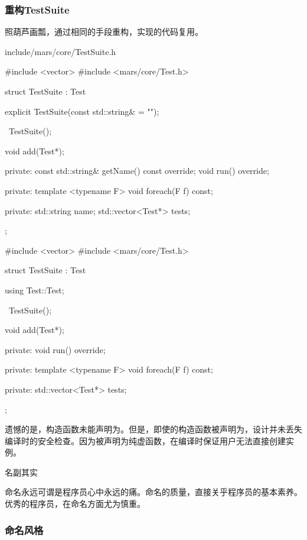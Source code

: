 \begin{content}
\subsubsection{重构TestSuite}

照葫芦画瓢，通过相同的手段重构，实现的代码复用。

\begin{diff}{include/mars/core/TestSuite.h}
 \begin{minicpp}
#include <vector>
#include <mars/core/Test.h>

struct TestSuite : Test {
  explicit TestSuite(const std::string& = "");

  ~TestSuite();

  void add(Test*);

private:
  const std::string& getName() const override;
  void run() override;

private:
  template <typename F>
  void foreach(F f) const;

private:
  std::string name;
  std::vector<Test*> tests;
};
 \end{minicpp}
\tcblower
 \begin{minicpp}
#include <vector>
#include <mars/core/Test.h>

struct TestSuite : Test {
  using Test::Test;

  ~TestSuite();

  void add(Test*);

private:
  void run() override;

private:
  template <typename F>
  void foreach(F f) const;

private:
  std::vector<Test*> tests;
};
 \end{minicpp}
\end{diff}

遗憾的是，构造函数未能声明为。但是，即使的构造函数被声明为，设计并未丢失编译时的安全检查。因为被声明为纯虚函数，在编译时保证用户无法直接创建实例。

\begin{episode}{名副其实}
\begin{content}

命名永远可谓是程序员心中永远的痛。命名的质量，直接关乎程序员的基本素养。优秀的程序员，在命名方面尤为慎重。

\subsubsection{命名风格}


\end{content}
\end{episode}
\end{content}
